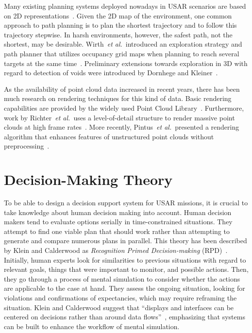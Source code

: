 \documentclass{egpubl}
\def\etal{\textit{et al.}}
\begin{document}
Many existing planning systems deployed nowadays in USAR scenarios are based on 2D representations~\cite{kleiner_et_al_ssrr09,KohlbrecherMeyerStrykKlingaufFlexibleSlamSystem2011,Pellenz2009SMU}. Given the 2D map of the environment, one common approach to path planning is to plan the shortest trajectory and to follow this trajectory stepwise. In harsh environments, however, the safest path, not the shortest, may be desirable. Wirth~\etal\ introduced an exploration strategy and path planner that utilizes occupancy grid maps when planning to reach several targets at the same time~\cite{Wirth2007ETA1}. Preliminary extensions towards exploration in 3D with regard to detection of voids were introduced by Dornhege and Kleiner~\cite{dornhege2011frontier}.

 As the availability of point cloud data increased in recent years, there has been much research on rendering techniques for this kind of data. Basic rendering capabilities are provided by the widely used Point Cloud Library~\cite{Rusu11ICRA}. Furthermore, work by Richter~\etal\ uses a level-of-detail structure to render massive point clouds at high frame rates~\cite{Richter:2010:ORV:1811158.1811178}. More recently, Pintus~\etal\ presented a rendering algorithm that enhances features of unstructured point clouds without preprocessing~\cite{Pintus:2011:RRM:2384495.2384513}.


\section{Decision-Making Theory} \label{sec:theory}
To be able to design a decision support system for USAR missions, it is crucial to take knowledge about human decision making into account. Human decision makers tend to evaluate options serially in time-constrained situations. They attempt to find one viable plan that should work rather than attempting to generate and compare numerous plans in parallel. This theory has been described by Klein and Calderwood as \emph{Recognition Primed Decision-making} (RPD)~\cite{KleinCalderwood}. Initially, human experts look for similarities to previous situations with regard to relevant goals, things that were important to monitor, and possible actions. Then, they go through a process of mental simulation to consider whether the actions are applicable to the case at hand. They assess the ongoing situation, looking for violations and confirmations of expectancies, which may require reframing the situation. Klein and Calderwood suggest that ``displays and interfaces can be centered on decisions rather than around data flows''~\cite{KleinCalderwood}, emphasizing that systems can be built to enhance the workflow of mental simulation. 
\end{document}

